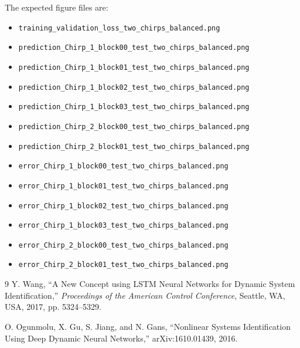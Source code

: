 \documentclass[11pt]{article}
\begin{document}
The expected figure files are:
\begin{itemize}[leftmargin=1.5em]
    \item \texttt{training\_validation\_loss\_two\_chirps\_balanced.png}
    \item \texttt{prediction\_Chirp\_1\_block00\_test\_two\_chirps\_balanced.png}
    \item \texttt{prediction\_Chirp\_1\_block01\_test\_two\_chirps\_balanced.png}
    \item \texttt{prediction\_Chirp\_1\_block02\_test\_two\_chirps\_balanced.png}
    \item \texttt{prediction\_Chirp\_1\_block03\_test\_two\_chirps\_balanced.png}
    \item \texttt{prediction\_Chirp\_2\_block00\_test\_two\_chirps\_balanced.png}
    \item \texttt{prediction\_Chirp\_2\_block01\_test\_two\_chirps\_balanced.png}
    \item \texttt{error\_Chirp\_1\_block00\_test\_two\_chirps\_balanced.png}
    \item \texttt{error\_Chirp\_1\_block01\_test\_two\_chirps\_balanced.png}
    \item \texttt{error\_Chirp\_1\_block02\_test\_two\_chirps\_balanced.png}
    \item \texttt{error\_Chirp\_1\_block03\_test\_two\_chirps\_balanced.png}
    \item \texttt{error\_Chirp\_2\_block00\_test\_two\_chirps\_balanced.png}
    \item \texttt{error\_Chirp\_2\_block01\_test\_two\_chirps\_balanced.png}
\end{itemize}

\begin{thebibliography}{9}
Y. Wang, ``A New Concept using LSTM Neural Networks for Dynamic System Identification,'' \textit{Proceedings of the American Control Conference}, Seattle, WA, USA, 2017, pp. 5324--5329.

O. Ogunmolu, X. Gu, S. Jiang, and N. Gans, ``Nonlinear Systems Identification Using Deep Dynamic Neural Networks,'' arXiv:1610.01439, 2016.
\end{thebibliography}
\end{document}
